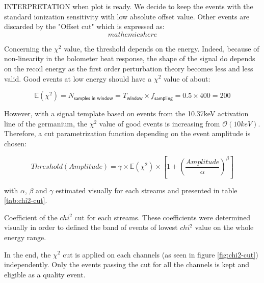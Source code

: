 INTERPRETATION when plot is ready.
We decide to keep the events with the standard ionization sensitivity with low absolute offset value. Other events are discarded by the "Offset cut" which is expressed as:
$$ mathemics here $$


Concerning the $\chi^2$ value, the threshold depends on the energy. Indeed, because of non-linearity in the bolometer heat response, the shape of the signal do depends on the recoil energy as the first order perturbation theory becomes less and less valid.
Good events at low energy should have a $\chi^2$ value of about:

\begin{equation}
\mathbb{E}\left( \chi^2 \right) 
= N_{\textsf{samples in window}}
 = T_{\textsf{window}} \times f_{\textsf{sampling}}
 = 0.5 \times 400 = 200
\end{equation}

However, with a signal template based on events from the 10.37keV activation line of the germanium, the $\chi^2$ value of good events is increasing from $\mathcal{O}(10keV)$.
Therefore, a cut parametrization function depending on the event amplitude is chosen:

\begin{equation}
Threshold(Amplitude) 
= \gamma \times \mathbb{E}\left( \chi^2 \right)  \times \left[ 1+ \left( \frac{Amplitude}{\alpha} \right)^\beta \right]
\end{equation}

with $\alpha$, $\beta$ and $\gamma$ estimated visually for each streams and presented in table \ref{tab:chi2-cut}.

\begin{table}[]
\centering

\caption{Coefficient of the $chi^2$ cut for each streams. These coefficients were determined visually in order to defined the band of events of lowest $chi^2$ value on the whole energy range.}
\label{tab:chi2-cut}
\end{table}


In the end, the $\chi^2$ cut is applied on each channels (as seen in figure \ref{fig:chi2-cut}) independently. Only the events passing the cut for all the channels is kept and eligible as a quality event.

